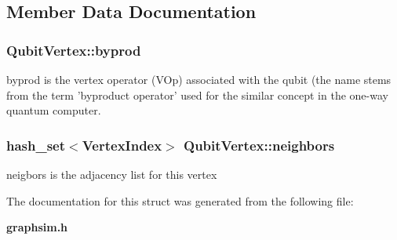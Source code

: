 \subsection{Member Data Documentation}
\subsubsection{ {\bf Qubit\-Vertex::byprod}}\label{structQubitVertex_o0}


byprod is the vertex operator (VOp) associated with the qubit (the name stems from the term 'byproduct operator' used for the similar concept in the one-way quantum computer. 
\subsubsection{\setlength{\rightskip}{0pt plus 5cm}hash\_\-set$<${\bf Vertex\-Index}$>$ {\bf Qubit\-Vertex::neighbors}}\label{structQubitVertex_o1}


neigbors is the adjacency list for this vertex 

The documentation for this struct was generated from the following file:\begin{CompactItemize}
\item 
{\bf graphsim.h}\end{CompactItemize}

